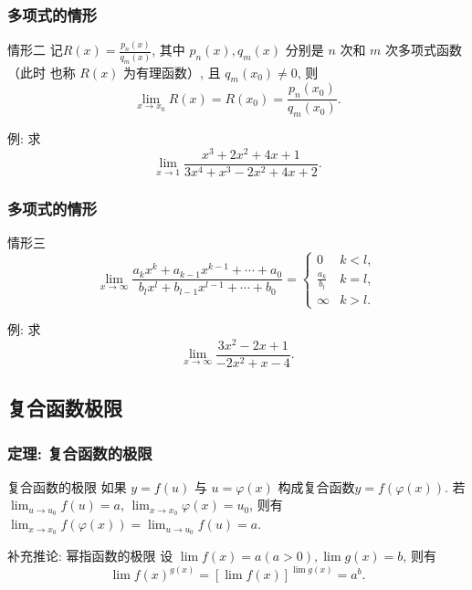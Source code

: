 \documentclass[
10pt,  
aspectratio=43,  
]{beamer}
\begin{document}
\begin{frame}
	\frametitle{多项式的情形}
	
	\begin{exampleblock}{情形二}
		记$R(x)=\displaystyle\frac{p_n(x)}{q_m(x)}$,   其中 $p_n(x),   q_m(x)$ 分别是 $n$ 次和 $m$ 次多项式函数（此时 也称 $R(x)$ 为有理函数）,  且 $q_m\left(x_0\right) \neq 0$,   则
		$$\lim _{x \rightarrow x_0} R(x)=R\left(x_0\right)=\frac{p_n\left(x_0\right)}{q_m\left(x_0\right)}.$$
	\end{exampleblock}
	例:  求 $$\lim _{x \rightarrow 1} \frac{x^3+2 x^2+4 x+1}{3 x^4+x^3-2 x^2+4 x+2}.$$
	
\end{frame}

\begin{frame}
	\frametitle{多项式的情形}
	
	\begin{exampleblock}{情形三}
		$$
		\lim _{x \rightarrow \infty} \frac{a_k x^k+a_{k-1} x^{k-1}+\cdots+a_0}{b_l x^{l}+b_{l-1} x^{l-1}+\cdots+b_0}=\left\{\begin{array}{cc}
		0 & k<l,   \\
		\displaystyle\frac{a_k}{b_l} & k=l,   \\
		\infty & k>l.
		\end{array}\right.
		$$
	\end{exampleblock}
	例:  求 $$\displaystyle\lim_{x \rightarrow \infty} \frac{3 x^2-2 x+1}{-2 x^2+x-4}.$$
\end{frame}

\subsection{复合函数极限}

\begin{frame}
	\frametitle{定理: 复合函数的极限}
	
	\begin{block}{复合函数的极限}
		如果 $y=f(u)$ 与 $u=\varphi(x)$ 构成复合函数$y=f(\varphi(x))$. 若 $\lim _{u \rightarrow u_0} f(u)=a$,   $\lim _{x \rightarrow x_0} \varphi(x)=u_0$,   则有 $\lim _{x \rightarrow x_0} f(\varphi(x))=\lim _{u \rightarrow u_0} f(u)=a$.
	\end{block}
	\pause
	\begin{exampleblock}{补充推论: 幂指函数的极限}
		设 $\lim f(x)=a(a>0),   \lim g(x)=b$,   则有
		$$
		\operatorname{\lim} f(x)^{g(x)}=[\lim f(x)]^{\lim g(x)}=a^b.
		$$
	\end{exampleblock}
\end{frame}
\end{document}
